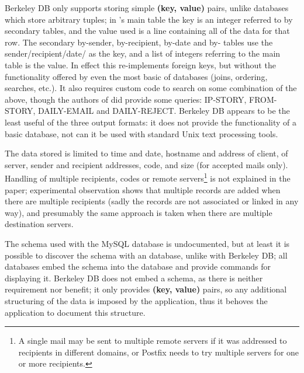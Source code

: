 Berkeley DB only supports storing simple \textbf{(key, value)} pairs,
unlike \SQL{} databases which store arbitrary tuples; in \LMA{}'s main
table the key is an integer referred to by secondary tables, and the value
used is a \CSV{} line containing all of the data for that row.  The
secondary by-sender, by-recipient, by-date and by-\IP{} tables use the
sender/recipient/date/\IP{} as the key, and a \CSV{} list of integers
referring to the main table is the value.  In effect this re-implements
\SQL{} foreign keys, but without the functionality offered by even the most
basic of \SQL{} databases (joins, ordering, searches, etc.).  It also
requires custom code to search on some combination of the above, though the
authors of \LMA{} did provide some queries: IP-STORY, FROM-STORY,
DAILY-EMAIL and DAILY-REJECT\@.  Berkeley DB appears to be the least useful
of the three output formats: it does not provide the functionality of a
basic \SQL{} database, not can it be used with standard Unix text
processing tools.

The data stored is limited to time and date, hostname and \IP{} address of
client, \IP{} of server, sender and recipient addresses, \SMTP{} code, and
size (for accepted mails only).  Handling of multiple recipients, \SMTP{}
codes or remote servers\footnote{A single mail may be sent to multiple
remote servers if it was addressed to recipients in different domains, or
Postfix needs to try multiple servers for one or more recipients.} is not
explained in the paper; experimental observation shows that multiple
records are added when there are multiple recipients (sadly the records are
not associated or linked in any way), and presumably the same approach is
taken when there are multiple destination servers.

The schema used with the MySQL database is undocumented, but at least it is
possible to discover the schema with an \SQL{} database, unlike with
Berkeley DB\@; all \SQL{} databases embed the schema into the database and
provide commands for displaying it.  Berkeley DB does not embed a schema,
as there is neither requirement nor benefit; it only provides \textbf{(key,
value)} pairs, so any additional structuring of the data is imposed by the
application, thus it behoves the application to document this structure.

